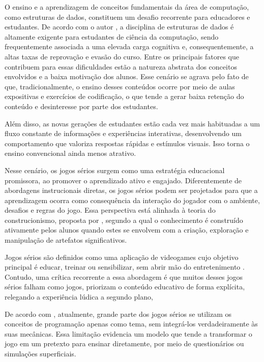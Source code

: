 O ensino e a aprendizagem de conceitos fundamentais da área de computação, como
estruturas de dados, constituem um desafio recorrente para educadores e
estudantes. De acordo com o autor , a
disciplina de estruturas de dados é altamente exigente para estudantes de
ciência da computação, sendo frequentemente associada a uma elevada carga
cognitiva e, consequentemente, a altas taxas de reprovação e evasão do curso.
Entre os principais fatores que contribuem para essas dificuldades estão a
natureza abstrata dos conceitos envolvidos e a baixa motivação dos alunos. Esse
cenário se agrava pelo fato de que, tradicionalmente, o ensino desses conteúdos
ocorre por meio de aulas expositivas e exercícios de codificação, o que tende a
gerar baixa retenção do conteúdo e desinteresse por parte dos estudantes.

Além disso, as novas gerações de estudantes estão cada vez mais habituadas a um
fluxo constante de informações e experiências interativas, desenvolvendo um
comportamento que valoriza respostas rápidas e estímulos visuais. Isso torna o
ensino convencional ainda menos atrativo. 

Nesse cenário, os jogos sérios surgem como uma estratégia educacional
promissora, ao promover o aprendizado ativo e engajado. Diferentemente de
abordagens instrucionais diretas, os jogos sérios podem ser projetados para que
a aprendizagem ocorra como consequência da interação do jogador com o ambiente,
desafios e regras do jogo. Essa perspectiva está alinhada à teoria do
construcionismo, proposta por , segundo a qual o
conhecimento é construído ativamente pelos alunos quando estes se envolvem com
a criação, exploração e manipulação de artefatos significativos.

Jogos sérios são definidos como uma aplicação de videogames cujo objetivo
principal é educar, treinar ou sensibilizar, sem abrir mão do entretenimento
\cite{mouaheb2012serious}. Contudo, uma crítica recorrente a essa abordagem é
que muitos desses jogos sérios falham como jogos, priorizam o conteúdo educativo de
forma explícita, relegando a experiência lúdica a segundo plano, 

De acordo com , atualmente, grande parte dos jogos sérios se
utilizam os conceitos de programação apenas como tema, sem integrá-los
verdadeiramente às suas mecânicas. Essa limitação evidencia um modelo que tende
a transformar o jogo em um pretexto para ensinar diretamente, por meio de
 questionários ou simulações superficiais.


